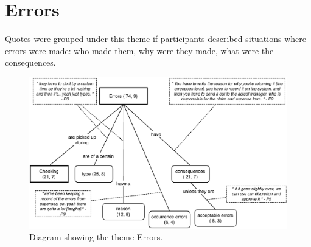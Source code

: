 \section{Errors}
Quotes were grouped under this theme if participants described situations where errors were made: who made them, why were they made, what were the consequences. 

\begin{figure}[!ht]
\centering
\includegraphics[width=\textwidth]{images/ch12/Errors.pdf}
\caption[Study 1 Errors diagram]{Diagram showing the theme Errors.}
\vspace{-9pt}
\label{fig:ch3_errors}
\end{figure}

\newpage

